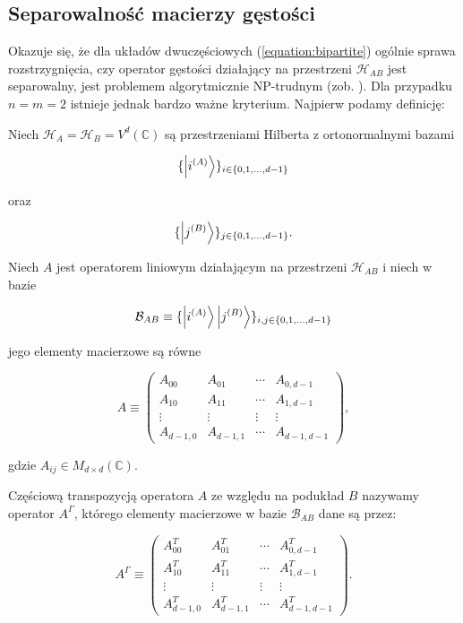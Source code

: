 \subsection{Separowalność macierzy gęstości}

Okazuje się, że dla układów dwuczęściowych (\ref{equation:bipartite}) ogólnie sprawa rozstrzygnięcia, czy operator gęstości działający na przestrzeni $\mathcal{H}_{AB}$ jest separowalny, jest problemem algorytmicznie NP-trudnym (zob. \cite{rh}). Dla przypadku $n = m = 2$ istnieje jednak bardzo ważne kryterium. Najpierw podamy definicję:

\begin{definition}
    Niech $\mathcal{H}_{A} = \mathcal{H}_{B} = V ^ {d}(\mathbb{C})$ są przestrzeniami Hilberta z ortonormalnymi bazami

    $$
        \{\ket{i ^ {(A)}}\}_{i \in \{0, 1, \ldots, d - 1\}}
    $$

    oraz

    $$
        \{\ket{j ^ {(B)}}\}_{j \in \{0, 1, \ldots, d - 1\}}.
    $$ 

    Niech $A$ jest operatorem liniowym działającym na przestrzeni $\mathcal{H}_{AB}$ i niech w bazie 

    $$
        \mathcal{B}_{AB} \equiv \{\ket{i ^ {(A)}} \ket{j ^ {(B)}}\}_{i, j \in \{0, 1, \ldots, d - 1\}}
    $$

    jego elementy macierzowe są równe

    $$
        A \equiv
        \begin{pmatrix}
            A_{00} & A_{01} & \cdots & A_{0, d - 1} \\
            A_{10} & A_{11} & \cdots & A_{1, d - 1 }\\
            \vdots & \vdots & \vdots & \vdots \\
            A_{d - 1, 0} & A_{d - 1, 1} & \cdots & A_{d - 1, d - 1}
        \end{pmatrix},
    $$

    gdzie $A_{ij} \in M_{d \times d}(\mathbb{C})$.

    Częściową transpozycją operatora $A$ ze względu na podukład $B$ nazywamy operator $A^{\Gamma}$, którego elementy macierzowe w bazie $\mathcal{B}_{AB}$ dane są przez:

    $$
        A ^ {\Gamma} \equiv
        \begin{pmatrix}
            A_{00} ^ {T} & A_{01} ^ {T} & \cdots & A_{0, d - 1} ^ {T} \\
            A_{10} ^ {T} & A_{11} ^ {T} & \cdots & A_{1, d - 1} ^ {T} \\
            \vdots & \vdots & \vdots & \vdots \\
            A_{d - 1, 0} ^ {T} & A_{d - 1, 1} ^ {T} & \cdots & A_{d - 1, d - 1} ^ {T}
        \end{pmatrix}.
    $$
\end{definition}

